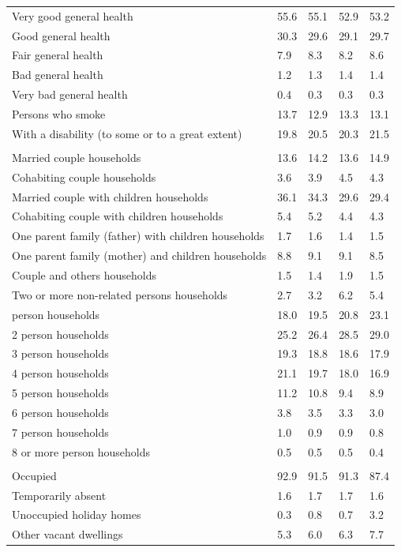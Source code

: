 \documentclass{article}
\begin{document}
\begin{table}[h]
\begin{tabular}{KTTTT}
    \hline
Very good general health & 55.6& 55.1&52.9& 53.2\\
Good general health & 30.3& 29.6& 29.1& 29.7\\
Fair general health & 7.9& 8.3&8.2& 8.6\\
Bad general health & 1.2& 1.3&1.4& 1.4\\
Very bad general health & 0.4& 0.3&0.3& 0.3\\
    \hline
Persons who smoke & 13.7& 12.9&13.3& 13.1\\
    \hline
With a disability (to some or to a great extent) & 19.8& 20.5&20.3& 21.5\\
\hline
    \\ 
    \hline
Married couple households & 13.6& 14.2& 13.6& 14.9\\
Cohabiting couple households & 3.6& 3.9& 4.5& 4.3\\
Married couple with children households & 36.1& 34.3& 29.6& 29.4\\
Cohabiting couple with children households & 5.4& 5.2& 4.4& 4.3\\
One parent family (father) with  children households & 1.7& 1.6& 1.4& 1.5\\
One parent family (mother) and children households & 8.8& 9.1& 9.1& 8.5\\
Couple and others households  & 1.5& 1.4& 1.9& 1.5\\
Two or more non-related persons households & 2.7& 3.2& 6.2& 5.4\\
     person households & 18.0& 19.5& 20.8& 23.1\\
2 person households & 25.2& 26.4& 28.5& 29.0\\
3 person households & 19.3& 18.8& 18.6& 17.9\\
4 person households & 21.1& 19.7& 18.0& 16.9\\
5 person households & 11.2& 10.8&  9.4&  8.9\\
6 person households & 3.8& 3.5& 3.3& 3.0\\
7 person households & 1.0& 0.9& 0.9& 0.8\\
8 or more person households & 0.5& 0.5& 0.5& 0.4\\
\hline
    \\ 
    \hline
Occupied & 92.9& 91.5& 91.3& 87.4\\
Temporarily absent & 1.6& 1.7& 1.7& 1.6\\
Unoccupied holiday homes & 0.3& 0.8& 0.7& 3.2\\
Other vacant dwellings & 5.3& 6.0& 6.3& 7.7\\
\hline
\end{tabular}
\end{table}
\end{document}
